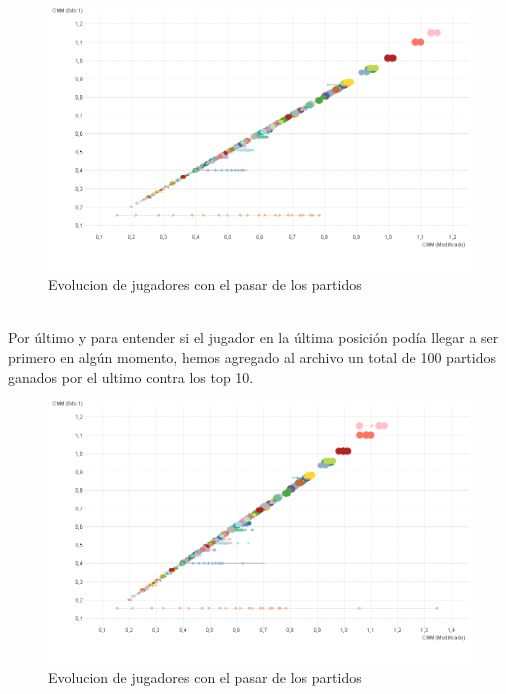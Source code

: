 \begin{figure}[H]
\centering
\includegraphics[width=1\textwidth]{IMG/comparativa cmm -cmm foto 10.png}
\caption{Evolucion de jugadores con el pasar de los partidos}
\label{fig:Evolucion de jugadores con el pasar de los partidos}
\end{figure}

\\
Por último y para entender si el jugador en la última posición podía llegar a ser primero en algún momento, hemos agregado al archivo un total de 100 partidos ganados por el ultimo contra 
los top 10.
\\

\begin{figure}[H]
\centering
\includegraphics[width=1\textwidth]{IMG/comparativa cmm -cmm foto 100.png}
\caption{Evolucion de jugadores con el pasar de los partidos}
\label{fig:Evolucion de jugadores con el pasar de los partidos}
\end{figure}

